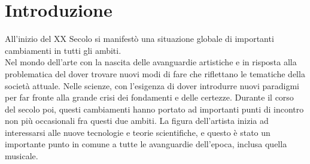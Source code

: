 
\section{Introduzione}
\label{sec:Introduzione}

All'inizio del XX Secolo si manifestò una situazione globale
di importanti cambiamenti in tutti gli ambiti. \\
Nel mondo dell'arte con la nascita delle avanguardie artistiche e
in risposta alla problematica del dover trovare nuovi modi di fare
che riflettano le tematiche della società attuale.
Nelle scienze, con l'esigenza di dover introdurre nuovi paradigmi
per far fronte alla grande crisi dei fondamenti e delle certezze.
Durante il corso del secolo poi, questi cambiamenti hanno portato
ad importanti punti di incontro non più occasionali fra questi due ambiti.
La figura dell'artista inizia ad interessarsi alle nuove tecnologie
e teorie scientifiche, e questo è stato un importante punto in comune a tutte
le avanguardie dell'epoca, inclusa quella musicale. \\


